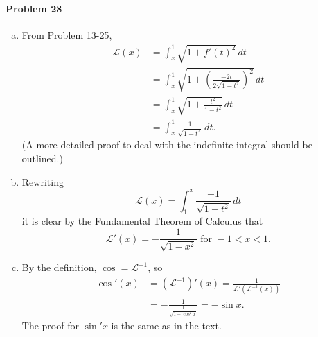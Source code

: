 \documentclass{article}
\begin{document}
\paragraph{Problem 28}
\begin{enumerate}[(a)]
  \item From Problem 13-25,
    \begin{align*}
      \mathcal{L}(x)
      &= \int_x^1 \sqrt{1 + f'(t)^2} \,dt \\
      &= \int_x^1 \sqrt{1 +
      \left( \frac{-2t}{2\sqrt{1 - t^2}} \right)^2} \,dt \\
      &= \int_x^1 \sqrt{1 + \frac{t^2}{1 - t^2}} \,dt \\
      &= \int_x^1 \frac{1}{\sqrt{1 - t^2}} \,dt.
    \end{align*}
    (A more detailed proof to deal with the indefinite integral should be
    outlined.)
  \item Rewriting \[
      \mathcal{L}(x) = \int_1^x \frac{-1}{\sqrt{1 - t^2}} \,dt
    \] it is clear by the Fundamental Theorem of Calculus that \[
      \mathcal{L'}(x) = -\frac{1}{\sqrt{1 - x^2}} \text{ for } -1 < x < 1.
    \]
  \item By the definition, $\cos = \mathcal{L}^{-1}$, so
    \begin{align*}
      \cos'(x)
      &= (\mathcal{L}^{-1})'(x)
      = \frac{1}{\mathcal{L}'(\mathcal{L}^{-1}(x))} \\
      &= -\frac{1}{\frac{1}{\sqrt{1 - \cos^2 x}}}
      = -\sin x.
    \end{align*}
    The proof for $\sin' x$ is the same as in the text.
\end{enumerate}
\end{document}
